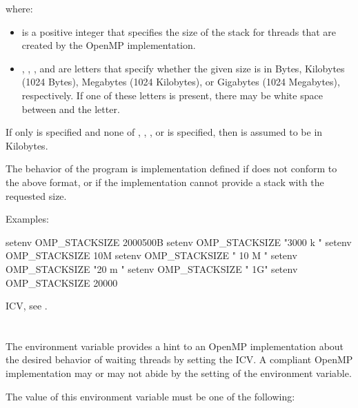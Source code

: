 where:

\begin{itemize}
\item {} is a positive integer that specifies the size of the
      stack for threads that are created by the OpenMP implementation.
\item {}, , , and  are letters that specify
      whether the given size is in Bytes, Kilobytes (1024 Bytes), Megabytes
      (1024 Kilobytes), or Gigabytes (1024 Megabytes), respectively. If
      one of these letters is present, there may be white space between
       and the letter.
\end{itemize}

If only  is specified and none of , , ,
or  is specified, then  is assumed to be in Kilobytes.

The behavior of the program is implementation defined if 
does not conform to the above format, or if the implementation cannot provide
a stack with the requested size.

Examples:
\begin{ompEnv}
setenv OMP_STACKSIZE 2000500B
setenv OMP_STACKSIZE "3000 k "
setenv OMP_STACKSIZE 10M
setenv OMP_STACKSIZE " 10 M "
setenv OMP_STACKSIZE "20 m "
setenv OMP_STACKSIZE " 1G"
setenv OMP_STACKSIZE 20000
\end{ompEnv}

\begin{crossrefs}
\item {} ICV, see .
\end{crossrefs}



\section{}
\label{sec:OMP_WAIT_POLICY}
The  environment variable provides a hint to an OpenMP
implementation about the desired behavior of waiting threads by setting the
 ICV. A compliant OpenMP implementation may or may not
abide by the setting of the environment variable.

The value of this environment variable must be one of the following:

